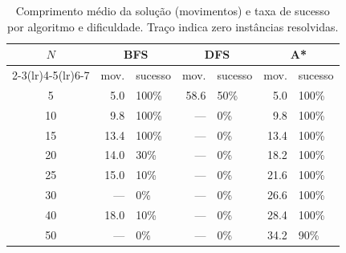 \begin{table}[htbp]
\centering
\caption{Comprimento médio da solução (movimentos) e taxa de sucesso por algoritmo e dificuldade. Traço indica zero instâncias resolvidas.}
\label{tab:solution}
\begin{tabular}{crlrlrl}
\toprule
$N$ & \multicolumn{2}{c}{BFS} & \multicolumn{2}{c}{DFS} & \multicolumn{2}{c}{A*} \\
\cmidrule(lr){2-3}\cmidrule(lr){4-5}\cmidrule(lr){6-7}
 & mov. & sucesso & mov. & sucesso & mov. & sucesso \\
\midrule
5 & 5.0 & 100\% & 58.6 & 50\% & 5.0 & 100\% \\
10 & 9.8 & 100\% & — & 0\% & 9.8 & 100\% \\
15 & 13.4 & 100\% & — & 0\% & 13.4 & 100\% \\
20 & 14.0 & 30\% & — & 0\% & 18.2 & 100\% \\
25 & 15.0 & 10\% & — & 0\% & 21.6 & 100\% \\
30 & — & 0\% & — & 0\% & 26.6 & 100\% \\
40 & 18.0 & 10\% & — & 0\% & 28.4 & 100\% \\
50 & — & 0\% & — & 0\% & 34.2 & 90\% \\
\bottomrule
\end{tabular}
\end{table}
